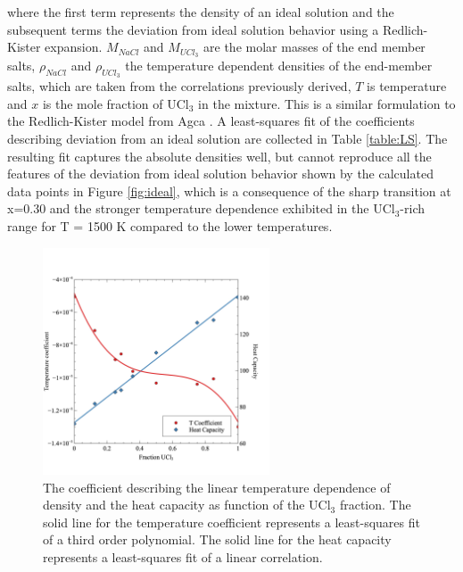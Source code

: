 \documentclass[preprint,3p,10pt,onecolumn,number,sort&compress]{elsarticle}
\begin{document}
{\noindent where the first term represents the density of an ideal solution and the subsequent terms the deviation from ideal solution behavior using a Redlich-Kister expansion. $M_{NaCl}$ and $M_{UCl_3}$ are the molar masses of the end member salts, $\rho_{NaCl}$ and $\rho_{UCl_3}$ the temperature dependent densities of the end-member salts, which are taken from the correlations previously derived, $T$ is temperature and $x$ is the mole fraction of UCl$_3$ in the mixture. This is a similar formulation to the Redlich-Kister model from Agca \cite{agca2022}. A least-squares fit of the coefficients describing deviation from an ideal solution are collected in Table \ref{table:LS}. 
 The resulting fit captures the absolute densities well, but cannot reproduce all the features of the deviation from ideal solution behavior shown by the calculated data points in Figure \ref{fig:ideal}, which is a consequence of the sharp transition at x=0.30 and the stronger temperature dependence exhibited in the UCl$_3$-rich range for T = 1500 K compared to the lower temperatures. 

\begin{figure}[htb]
\centering
\includegraphics[width=0.6\textwidth]{fig8.jpg}
\caption{The coefficient describing the linear temperature dependence of density and the heat capacity as function of the UCl$_3$ fraction. The solid line for the temperature coefficient represents a least-squares fit of a third order polynomial. The solid line for the heat capacity represents a least-squares fit of a linear correlation.}
\label{fig:TandCp}
\end{figure}

}
\end{document}
